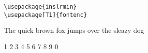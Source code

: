 \documentclass[a4paper]{article}
\newcommand{\frase}{The quick brown fox jumps over the sleazy dog}
\begin{document}
\normalfont\iminfamily

\begin{verbatim}
\usepackage{inslrmin}
\usepackage[T1]{fontenc}
\end{verbatim}

\frase

1 2 3 4 5 6 7 8 9 0
\end{document}
